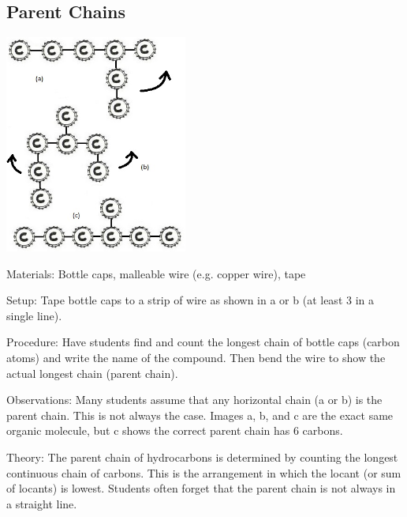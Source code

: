 \begin{multicols}{2}
\subsection{Parent Chains}

\begin{center}
\includegraphics[width=0.45\textwidth]{./img/carbon-chain.jpg}
\end{center}

\begin{description*}
\item[Materials:]{Bottle caps, malleable wire (e.g. copper wire), tape}
\item[Setup:]{Tape bottle caps to a strip of wire as shown in a or b (at least 3 in a single line).}
\item[Procedure:]{Have students find and count the longest chain of bottle caps (carbon atoms) and write the name of the compound. Then bend the wire to show the actual longest chain (parent chain).}
\item[Observations:]{Many students assume that any horizontal chain (a or b) is the parent chain. This is not always the case. Images a, b, and c are the exact same organic molecule, but c shows the correct parent chain has 6 carbons.}
\item[Theory:]{The parent chain of hydrocarbons is determined by counting the longest continuous chain of carbons. This is the arrangement in which the locant (or sum of locants) is lowest. Students often forget that the parent chain is not always in a straight line.}
\end{description*}


\end{multicols}
